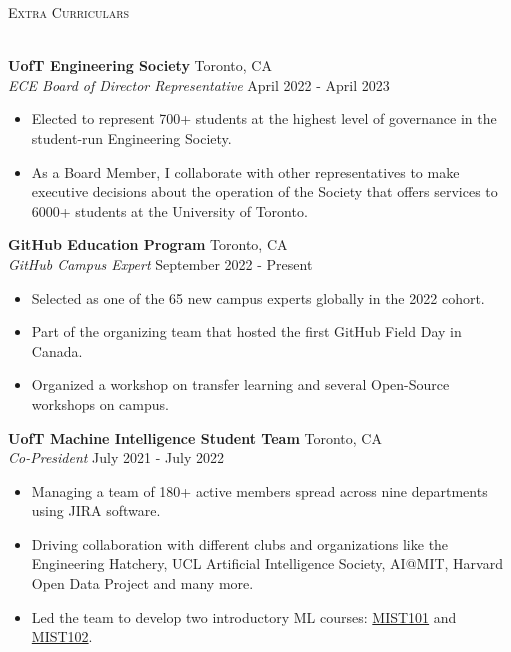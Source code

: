 \documentclass[a4paper]{article}
\newcommand{\lineunder} {
    \vspace*{-8pt} \\
    \hspace*{-18pt} \hrulefill \\
}
\newcommand{\header} [1] {
    {\hspace*{-18pt}\vspace*{6pt} \textsc{#1}}
    \vspace*{-6pt} \lineunder
}
\begin{document}
\header{Extra Curriculars}
\vspace{1mm}

\textbf{UofT Engineering Society} \hfill Toronto, CA\\
\textit{ECE Board of Director Representative} \hfill April 2022 - April 2023\\
\vspace{-1mm}
\begin{itemize} \itemsep 0.5pt
	\item Elected to represent 700+ students at the highest level of governance in the student-run Engineering Society.
	\item As a Board Member, I collaborate with other representatives to make executive decisions about the operation of the Society that offers services to 6000+ students at the University of Toronto.
\end{itemize}

\textbf{GitHub Education Program} \hfill Toronto, CA\\
\textit{GitHub Campus Expert} \hfill September 2022 - Present\\
\vspace{-1mm}
\begin{itemize} \itemsep 0.5pt
	\item Selected as one of the 65 new campus experts globally in the 2022 cohort.
    \item Part of the organizing team that hosted the first GitHub Field Day in Canada.
    \item Organized a workshop on transfer learning and several Open-Source workshops on campus.
\end{itemize}

\textbf{UofT Machine Intelligence Student Team} \hfill Toronto, CA\\
\textit{Co-President} \hfill July 2021 - July 2022\\
\vspace{-1mm}
\begin{itemize} \itemsep 0.5pt
	\item Managing a team of 180+ active members spread across nine departments using JIRA software.
	\item Driving collaboration with different clubs and organizations like the Engineering Hatchery, UCL Artificial Intelligence Society, AI@MIT, Harvard Open Data Project and many more.
    \item Led the team to develop two introductory ML courses: \href{https://youtu.be/jhoN9TPSSFw}{MIST101} and \href{https://youtu.be/j76CeiJanKw}{MIST102}.
\end{itemize}
\end{document}
